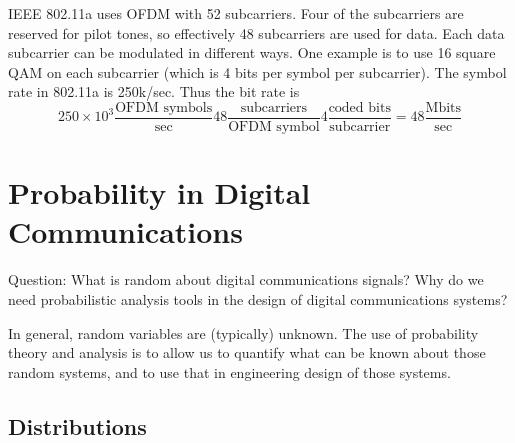   IEEE 802.11a uses OFDM with 52 subcarriers.  Four of the subcarriers are reserved for pilot tones, so effectively 48 subcarriers are used for data.  Each data subcarrier can be modulated in different ways.  One example is to use 16 square QAM on each subcarrier (which is 4 bits per symbol per subcarrier).  The symbol rate in 802.11a is 250k/sec.  Thus the bit rate is
\[
   250\times 10^3 \frac{\mbox{OFDM symbols}}{\mbox{sec}} 48 \frac{\mbox{subcarriers}}{\mbox{OFDM symbol}} 4 \frac{\mbox{coded bits}}{\mbox{subcarrier}} = 48 \frac{\mbox{Mbits}}{\mbox{sec}}
\]



\section{Probability in Digital Communications}

Question: What is random about digital communications signals?  Why do we need probabilistic analysis tools in the design of digital communications systems?


In general, random variables are (typically) unknown.  The use of probability theory and analysis is to allow us to quantify what can be known about those random systems, and to use that in engineering design of those systems.


\subsection{Distributions}

